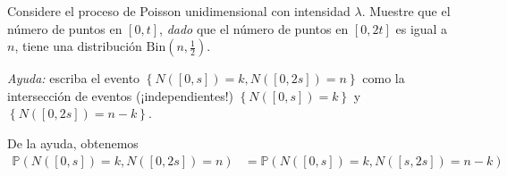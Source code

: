 \question
	 Considere el proceso de Poisson unidimensional con intensidad $\lambda$. Muestre que el número de puntos en $\left[0,t\right]$, \emph{dado} que el número de puntos en $\left[0,2t\right]$ es igual a $n$, tiene una distribución $\mathrm{Bin}\left(n,\tfrac{1}{2}\right)$.
	 
	 \noindent\emph{Ayuda:} escriba el evento $\left\{N\left(\left[0,s\right]\right)=k,N\left(\left[0,2s\right]\right)=n\right\}$ como la intersección de eventos (¡independientes!) $\left\{N\left(\left[0,s\right]\right)=k\right\}$ y $\left\{N\left(\left[0,2s\right]\right)=n-k\right\}$.

	\begin{solutionordottedlines}
		De la ayuda, obtenemos
		\begin{align*}
			\mathds{P}\left(N\left(\left[0,s\right]\right)=k,N\left(\left[0,2s\right]\right)=n\right)
			&=\mathds{P}\left(N\left(\left[0,s\right]\right)=k,N\left(\left[s,2s\right]\right)=n-k\right)
		\end{align*}
	\end{solutionordottedlines}